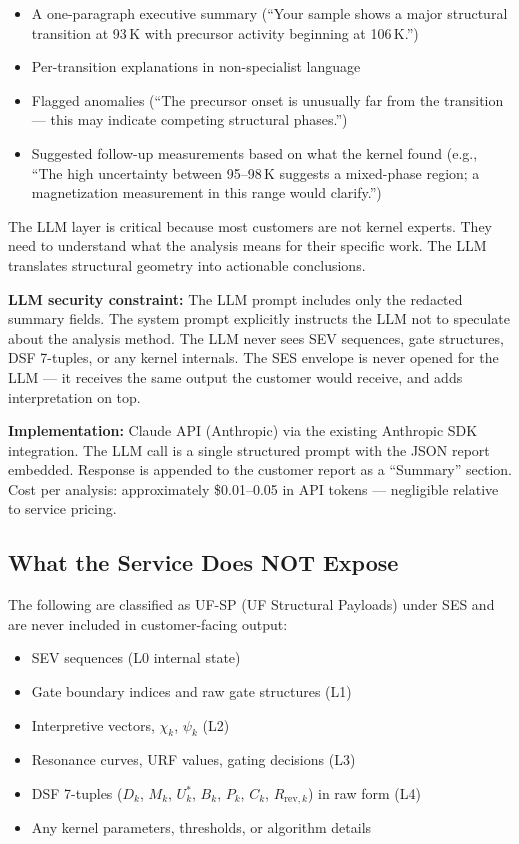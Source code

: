 \documentclass[11pt,letterpaper]{article}
\begin{document}
\begin{itemize}
  \item A one-paragraph executive summary (``Your sample shows a
    major structural transition at 93\,K with precursor activity
    beginning at 106\,K.'')
  \item Per-transition explanations in non-specialist language
  \item Flagged anomalies (``The precursor onset is unusually far
    from the transition --- this may indicate competing structural
    phases.'')
  \item Suggested follow-up measurements based on what the kernel
    found (e.g., ``The high uncertainty between 95--98\,K suggests
    a mixed-phase region; a magnetization measurement in this range
    would clarify.'')
\end{itemize}

The LLM layer is critical because most customers are not kernel
experts. They need to understand what the analysis means for their
specific work. The LLM translates structural geometry into
actionable conclusions.

\textbf{LLM security constraint:} The LLM prompt includes only the
redacted summary fields. The system prompt explicitly instructs the
LLM not to speculate about the analysis method. The LLM never sees
SEV sequences, gate structures, DSF 7-tuples, or any kernel internals.
The SES envelope is never opened for the LLM --- it receives the same
output the customer would receive, and adds interpretation on top.

\textbf{Implementation:} Claude API (Anthropic) via the existing
Anthropic SDK integration. The LLM call is a single structured prompt
with the JSON report embedded. Response is appended to the customer
report as a ``Summary'' section. Cost per analysis: approximately
\$0.01--0.05 in API tokens --- negligible relative to service pricing.

\subsection{What the Service Does NOT Expose}

The following are classified as UF-SP (UF Structural Payloads) under
SES and are never included in customer-facing output:
\begin{itemize}
  \item SEV sequences (L0 internal state)
  \item Gate boundary indices and raw gate structures (L1)
  \item Interpretive vectors, $\chi_k$, $\psi_k$ (L2)
  \item Resonance curves, URF values, gating decisions (L3)
  \item DSF 7-tuples ($D_k$, $M_k$, $U^*_k$, $B_k$, $P_k$, $C_k$,
    $R_{\text{rev},k}$) in raw form (L4)
  \item Any kernel parameters, thresholds, or algorithm details
\end{itemize}
\end{document}
